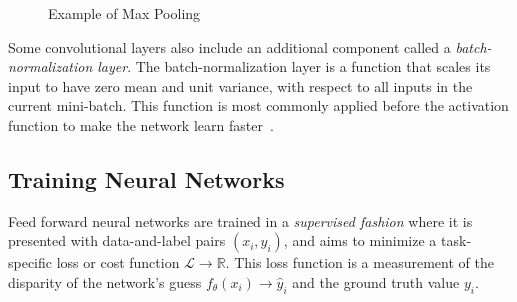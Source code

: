 \begin{figure}[H]
    \centering
    \caption{Example of Max Pooling}
    \label{fig:pool}
\end{figure}

Some convolutional layers also include an additional component called a \textit{batch-normalization layer}. The batch-normalization layer is a function that scales its input to have zero mean and unit variance, with respect to all inputs in the current mini-batch. This function is most commonly applied before the activation function to make the network learn faster~\cite{batchnorm}.

\subsection{Training Neural Networks}
Feed forward neural networks are trained in a \textit{supervised fashion} where it is presented with data-and-label pairs $(x_i, y_i)$, and aims to minimize a task-specific loss or cost function $\mathcal{L} \rightarrow \mathbb{R}$. This loss function is a measurement of the disparity of the network's guess $f_{\theta}(x_i) \rightarrow \hat{y}_i$ and the ground truth value $y_i$.

